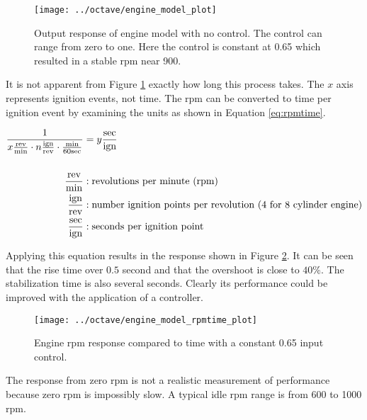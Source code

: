 \documentclass{article}
\begin{document}
\begin{figure}[htbp!]
\begin{center}
\texttt{[image: ../octave/engine\_model\_plot]}
\end{center}
\caption{Output response of engine model with no control.
The control can range from zero to one.
Here the control is constant at 0.65 which resulted in a stable
rpm near 900.\protect\footnotemark}
\label{fig:em_plot}
\end{figure}

It is not apparent from Figure \ref{fig:em_plot} exactly how long
this process takes.
The $x$ axis represents ignition events, not time.
The rpm can be converted to time per ignition event by examining
the units as shown in Equation \ref{eq:rpmtime}.

\begin{align}
\frac{1}{x \frac{\text{rev}}{\text{min}}
			\cdot n \frac{\text{ign}}{\text{rev}}
			\cdot \frac{\text{min}}{60\text{sec}}
		}
&= y \frac{\text{sec}}{\text{ign}} \label{eq:rpmtime} \\
& \notag \\
	\frac{\text{rev}}{\text{min}} &: \text{revolutions per minute (rpm)} \notag \\
	\frac{\text{ign}}{\text{rev}} &: \text{number ignition points per revolution (4 for 8 cylinder engine)} \notag \\
	\frac{\text{sec}}{\text{ign}} &: \text{seconds per ignition point} \notag
\end{align}

Applying this equation results in the response shown
in Figure \ref{fig:rpmtime_plot}.
It can be seen that the rise time over $0.5$ second and
that the overshoot is close to $40\%$.
The stabilization time is also several seconds.
Clearly its performance could be improved with the application
of a controller.

\begin{figure}[htbp!]
\begin{center}
\texttt{[image: ../octave/engine\_model\_rpmtime\_plot]}
\end{center}
\caption{Engine rpm response compared to time with a constant
0.65 input control.}
\label{fig:rpmtime_plot}
\end{figure}

The response from zero rpm is not a realistic measurement of performance
because zero rpm is impossibly slow.
A typical idle rpm range is from 600 to 1000 rpm.
\end{document}
